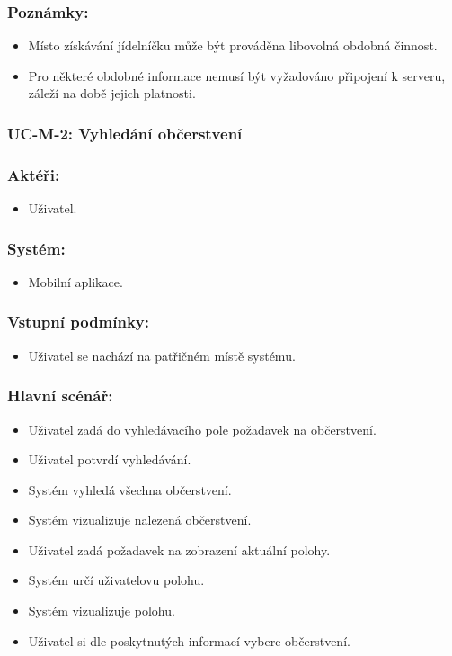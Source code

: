 \subsubsection*{Poznámky:}
\begin{itemize}
 \item Místo získávání jídelníčku může být prováděna libovolná obdobná činnost.
 \item Pro některé obdobné informace nemusí být vyžadováno připojení k serveru, záleží na době jejich platnosti.
\end{itemize}

\subsubsection{UC-M-2: Vyhledání občerstvení}
\subsubsection*{Aktéři:}
\begin{itemize}
 \item Uživatel.
\end{itemize}
\subsubsection*{Systém:}
\begin{itemize}
 \item Mobilní aplikace.
\end{itemize}
\subsubsection*{Vstupní podmínky:}
\begin{itemize}
 \item Uživatel se nachází na patřičném místě systému.
\end{itemize}
\subsubsection*{Hlavní scénář:}
\begin{itemize}
 \item Uživatel zadá do vyhledávacího pole požadavek na občerstvení.
 \item Uživatel potvrdí vyhledávání.
 \item Systém vyhledá všechna občerstvení.
 \item Systém vizualizuje nalezená občerstvení.
 \item Uživatel zadá požadavek na zobrazení aktuální polohy.
 \item Systém určí uživatelovu polohu.
 \item Systém vizualizuje polohu.
 \item Uživatel si dle poskytnutých informací vybere občerstvení.
\end{itemize}
